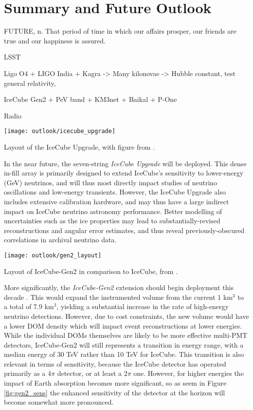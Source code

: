 \setchapterpreamble[u]{\margintoc}
\chapter{Summary and Future Outlook}
\begin{fquote} FUTURE, n. That period of time in which our affairs prosper, our friends are true and our happiness is assured.  
\end{fquote}

LSST

Ligo O4 + LIGO India + Kagra -> Many kilonovae -> Hubble constant, test general relativity, 

IceCube Gen2 + PeV band + KM3net + Baikal + P-One

Radio


\begin{marginfigure}
	\centering \texttt{[image: outlook/icecube\_upgrade]}
	\caption{Layout of the IceCube Upgrade, with figure from \cite{ic_upgrade}.}
	\label{fig:upgrade}
\end{marginfigure}

In the near future, the seven-string \emph{IceCube Upgrade} will be deployed. This dense in-fill array is primarily designed to extend IceCube's sensitivity to lower-energy (GeV) neutrinos, and will thus most directly impact studies of neutrino oscillations and low-energy transients. However, the IceCube Upgrade also includes extensive calibration hardware, and may thus have a large indirect impact on IceCube neutrino astronomy performance. Better modelling of uncertainties such as the ice properties may lead to substantially-revised reconstructions and angular error estimates, and thus reveal previously-obscured correlations in archival neutrino data.

\begin{marginfigure}
	\centering \texttt{[image: outlook/gen2\_layout]}
	\caption{Layout of IceCube-Gen2 in comparison to IceCube, from \cite{gen2_icrc}.}
	\label{fig:gen2_layout}
\end{marginfigure}

More significantly, the \emph{IceCube-Gen2} extension should begin deployment this decade \cite{gen2_icrc}. This would expand the instrumented volume from the current 1 km$^{3}$ to a total of 7.9 km$^{3}$, yielding  a substantial increase in the rate of high-energy neutrino detections. However, due to cost constraints, the new volume would have a lower DOM density which will impact event reconstructions at lower energies. While the individual DOMs themselves are likely to be more effective multi-PMT detectors, IceCube-Gen2 will still represents a transition in energy range, with a median energy of 30 TeV rather than 10 TeV for IceCube. This transition is also relevant in terms of sensitivity, because the IceCube detector has operated primarily as a 4$\pi$ detector, or at least a $2 \pi$ one. However, for higher energies the impact of Earth absorption becomes more significant, so as seem in Figure \ref{fig:gen2_sens} the enhanced sensitivity of the detector at the horizon will become somewhat more pronounced. 

